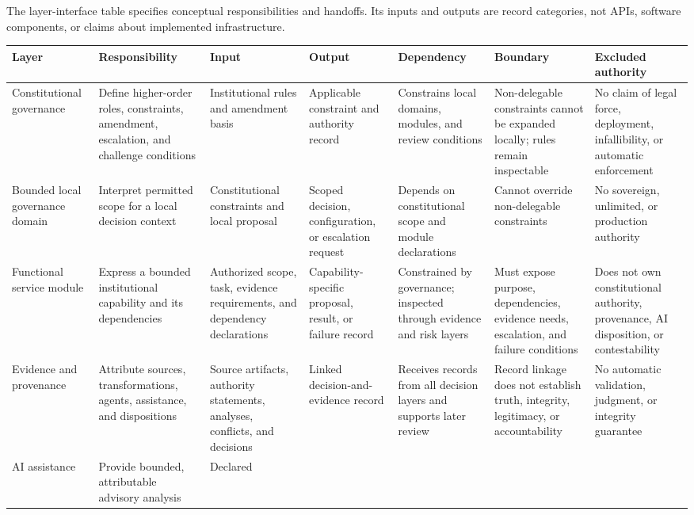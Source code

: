 \documentclass[11pt]{article}
\begin{document}
The layer-interface table specifies conceptual responsibilities and handoffs.
Its inputs and outputs are record categories, not APIs, software components,
or claims about implemented infrastructure.

\begin{landscape}
\begin{center}
\scriptsize
\begin{tabularx}{\linewidth}{|X|X|X|X|X|X|X|}
\hline
\textbf{Layer} & \textbf{Responsibility} & \textbf{Input} & \textbf{Output} &
\textbf{Dependency} & \textbf{Boundary} & \textbf{Excluded authority} \\
\hline
Constitutional governance & Define higher-order roles, constraints, amendment,
escalation, and challenge conditions & Institutional rules and amendment basis &
Applicable constraint and authority record & Constrains local domains, modules,
and review conditions & Non-delegable constraints cannot be expanded locally;
rules remain inspectable & No claim of legal force, deployment, infallibility,
or automatic enforcement \\
\hline
Bounded local governance domain & Interpret permitted scope for a local
decision context & Constitutional constraints and local proposal & Scoped
decision, configuration, or escalation request & Depends on constitutional
scope and module declarations & Cannot override non-delegable constraints & No
sovereign, unlimited, or production authority \\
\hline
Functional service module & Express a bounded institutional capability and its
dependencies & Authorized scope, task, evidence requirements, and dependency
declarations & Capability-specific proposal, result, or failure record &
Constrained by governance; inspected through evidence and risk layers & Must
expose purpose, dependencies, evidence needs, escalation, and failure
conditions & Does not own constitutional authority, provenance, AI disposition,
or contestability \\
\hline
Evidence and provenance & Attribute sources, transformations, agents,
assistance, and dispositions & Source artifacts, authority statements,
analyses, conflicts, and decisions & Linked decision-and-evidence record &
Receives records from all decision layers and supports later review & Record
linkage does not establish truth, integrity, legitimacy, or accountability &
No automatic validation, judgment, or integrity guarantee \\
\hline
AI assistance & Provide bounded, attributable advisory analysis & Declared

\end{tabularx}
\end{center}
\end{landscape}
\end{document}

